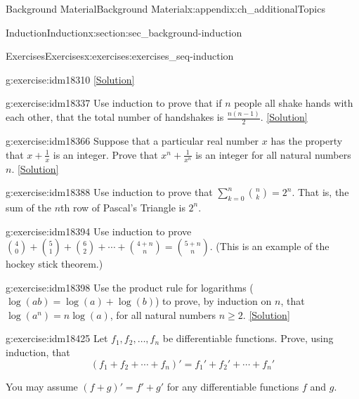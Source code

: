 \documentclass[oneside,10pt,]{book}
\numberwithin{equation}{chapter}
\def\d{\displaystyle}
\begin{document}
\begin{appendixptx}{Background Material}{}{Background Material}{}{}{x:appendix:ch_additionalTopics}
\begin{sectionptx}{Induction}{}{Induction}{}{}{x:section:sec_background-induction}
\begin{exercises-subsection}{Exercises}{}{Exercises}{}{}{x:exercises:exercises_seq-induction}
\begin{divisionexercise}{16}{}{}{g:exercise:idm18310}
\space\hspace*{0pt}\hfill{\tiny\hyperlink{g:solution:idm18318-main}{[Solution]}}\end{divisionexercise}%
\begin{divisionexercise}{17}{}{}{g:exercise:idm18337}%
Use induction to prove that if \(n\) people all shake hands with each other, that the total number of handshakes is \(\frac{n(n-1)}{2}\).%
\space\hspace*{0pt}\hfill{\tiny\hyperlink{g:solution:idm18342-main}{[Solution]}}\end{divisionexercise}%
\begin{divisionexercise}{18}{}{}{g:exercise:idm18366}%
Suppose that a particular real number \(x\) has the property that \(x + \frac{1}{x}\) is an integer. Prove that \(x^n + \frac{1}{x^n}\) is an integer for all natural numbers \(n\).%
\space\hspace*{0pt}\hfill{\tiny\hyperlink{g:solution:idm18373-main}{[Solution]}}\end{divisionexercise}%
\begin{divisionexercise}{19}{}{}{g:exercise:idm18388}%
Use induction to prove that \(\d\sum_{k=0}^n {n \choose k} = 2^n\). That is, the sum of the \(n\)th row of Pascal's Triangle is \(2^n\).%
\end{divisionexercise}%
\begin{divisionexercise}{20}{}{}{g:exercise:idm18394}%
Use induction to prove \({4 \choose 0} + {5 \choose 1} + {6 \choose 2} + \cdots + {4+n \choose n} = {5+n \choose n}\). (This is an example of the hockey stick theorem.)%
\end{divisionexercise}%
\begin{divisionexercise}{21}{}{}{g:exercise:idm18398}%
Use the product rule for logarithms (\(\log(ab) = \log(a) + \log(b)\)) to prove, by induction on \(n\), that \(\log(a^n) = n \log(a)\), for all natural numbers \(n \ge 2\).%
\space\hspace*{0pt}\hfill{\tiny\hyperlink{g:solution:idm18405-main}{[Solution]}}\end{divisionexercise}%
\begin{divisionexercise}{22}{}{}{g:exercise:idm18425}%
Let \(f_1, f_2,\ldots, f_n\) be differentiable functions. Prove, using induction, that%
\begin{equation*}
(f_1 + f_2 + \cdots + f_n)' = f_1' + f_2' + \cdots + f_n'
\end{equation*}
%
\par
You may assume \((f+g)' = f' + g'\) for any differentiable functions \(f\) and \(g\).%

\end{divisionexercise}
\end{exercises-subsection}
\end{sectionptx}
\end{appendixptx}
\end{document}
